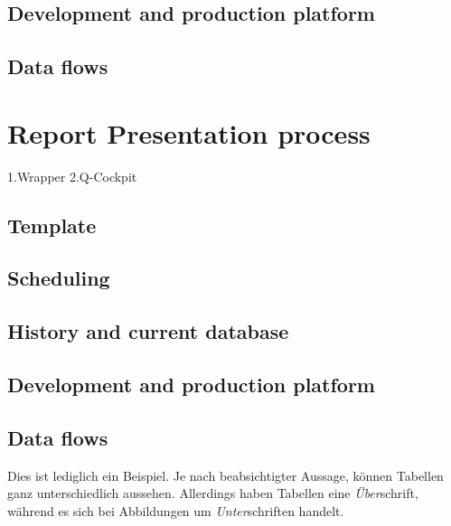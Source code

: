 \subsection{Development and production platform}
\subsection{Data flows}

\section{Report Presentation process}
1.Wrapper
2.Q-Cockpit
 
\subsection{Template}
\subsection{Scheduling}
\subsection{History and current database}
\subsection{Development and production platform}
\subsection{Data flows}

\noindent{}Dies ist lediglich ein Beispiel. Je nach beabsichtigter Aussage, können Tabellen ganz unterschiedlich aussehen. Allerdings haben Tabellen eine \emph{Über}schrift, während es sich bei Abbildungen um \emph{Unter}schriften handelt.



